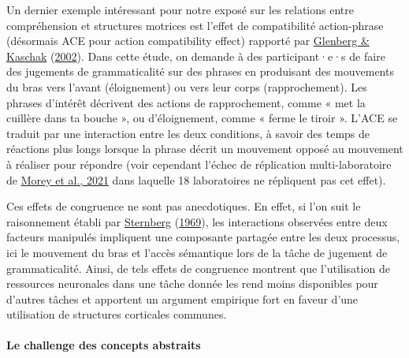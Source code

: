 \documentclass[
  a4paper,12pt,twoside,onecolumn,openright,final,oldfontcommands]{memoir}
\begin{document}
Un dernier exemple intéressant pour notre exposé sur les relations entre compréhension et structures motrices est l'effet de compatibilité action-phrase (désormais ACE pour action compatibility effect) rapporté par \protect\hyperlink{ref-glenberg_grounding_2002}{Glenberg \& Kaschak} (\protect\hyperlink{ref-glenberg_grounding_2002}{2002}). Dans cette étude, on demande à des participant·e·s de faire des jugements de grammaticalité sur des phrases en produisant des mouvements du bras vers l'avant (éloignement) ou vers leur corps (rapprochement). Les phrases d'intérêt décrivent des actions de rapprochement, comme « met la cuillère dans ta bouche », ou d'éloignement, comme « ferme le tiroir ». L'ACE se traduit par une interaction entre les deux conditions, à savoir des temps de réactions plus longs lorsque la phrase décrit un mouvement opposé au mouvement à réaliser pour répondre (voir cependant l'échec de réplication multi-laboratoire de \protect\hyperlink{ref-morey_pre-registered_2021}{Morey et al., 2021} dans laquelle 18 laboratoires ne répliquent pas cet effet).

Ces effets de congruence ne sont pas anecdotiques. En effet, si l'on suit le raisonnement établi par \protect\hyperlink{ref-sternberg_discovery_1969}{Sternberg} (\protect\hyperlink{ref-sternberg_discovery_1969}{1969}), les interactions observées entre deux facteurs manipulés impliquent une composante partagée entre les deux processus, ici le mouvement du bras et l'accès sémantique lors de la tâche de jugement de grammaticalité. Ainsi, de tels effets de congruence montrent que l'utilisation de ressources neuronales dans une tâche donnée les rend moins disponibles pour d'autres tâches et apportent un argument empirique fort en faveur d'une utilisation de structures corticales communes.

\hypertarget{le-challenge-des-concepts-abstraits}{%
\paragraph{Le challenge des concepts abstraits}\label{le-challenge-des-concepts-abstraits}}
\end{document}

